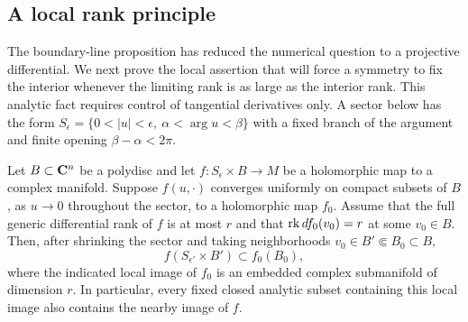 \subsection{A local rank principle}

The boundary-line proposition has reduced the numerical question to a
projective differential. We next prove the local assertion that will
force a symmetry to fix the interior whenever the limiting rank is
as large as the interior rank. This analytic fact requires control of tangential derivatives
only. A sector below has the form
$S_\epsilon=\{0<|u|<\epsilon,\ \alpha<\arg u<\beta\}$ with a fixed
branch of the argument and finite opening $\beta-\alpha<2\pi$.

\begin{lemma}\label{altord:h:rank-principle}
Let $B\subset\mathbf C^n$ be a polydisc and let
$f:S_\epsilon\times B\to M$ be a holomorphic map to a complex
manifold. Suppose $f(u,\cdot)$ converges uniformly on compact subsets
of $B$, as $u\to0$ throughout the sector, to a holomorphic map $f_0$.
Assume that the full generic differential rank of $f$ is at most $r$
and that $\operatorname{rk} df_0(v_0)=r$ at some $v_0\in B$.
Then, after shrinking the sector and taking neighborhoods
$v_0\in B'\Subset B_0\subset B$,
\[
 f(S_{\epsilon'}\times B')\subset f_0(B_0),
\]
where the indicated local image of $f_0$ is an embedded complex
submanifold of dimension $r$. In particular, every fixed closed analytic
subset containing this local image also contains the nearby image of $f$.
\end{lemma}

